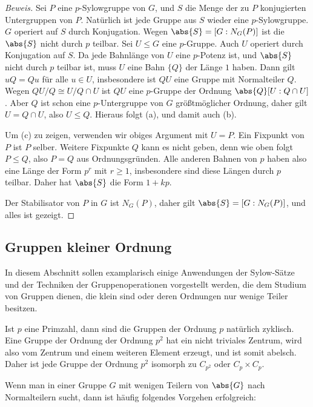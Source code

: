 \documentclass[12pt,a4paper,twoside]{article}
\begin{document}
\begin{proof}[Beweis]
  Sei $P$ eine $p$-Sylowgruppe von $G$, und $S$ die Menge der zu $P$
  konjugierten Untergruppen von $P$. Nat\"urlich ist jede Gruppe aus $S$
  wieder eine $p$-Sylowgruppe. $G$ operiert auf $S$ durch Konjugation. Wegen
  $\abs{S}=[G:N_G(P)]$ ist die $\abs{S}$ nicht durch $p$ teilbar. Sei $U\le G$
  eine $p$-Gruppe. Auch $U$ operiert durch Konjugation auf $S$. Da jede
  Bahnl\"ange von $U$ eine $p$-Potenz ist, und $\abs{S}$ nicht durch $p$
  teilbar ist, muss $U$ eine Bahn $\{Q\}$ der L\"ange $1$ haben. Dann gilt
  $uQ=Qu$ f\"ur alle $u\in U$, insbesondere ist $QU$ eine Gruppe mit
  Normalteiler $Q$. Wegen $QU/Q\cong U/Q\cap U$ ist $QU$ eine $p$-Gruppe der
  Ordnung $\abs{Q}[U:Q\cap U]$. Aber $Q$ ist schon eine $p$-Untergruppe von
  $G$ gr\"o\ss tm\"oglicher Ordnung, daher gilt $U=Q\cap U$, also $U\le Q$.
  Hieraus folgt (a), und damit auch (b).

Um (c) zu zeigen, verwenden wir obiges Argument mit $U=P$. Ein Fixpunkt von
$P$ ist $P$ selber. Weitere Fixpunkte $Q$ kann es nicht geben, denn wie oben
folgt $P\le Q$, also $P=Q$ aus Ordnungsgr\"unden. Alle anderen Bahnen von $p$
haben also eine L\"ange der Form $p^r$ mit $r\ge1$, insbesondere sind diese
L\"angen durch $p$ teilbar. Daher hat $\abs{S}$ die Form $1+kp$.

Der Stabilisator von $P$ in $G$ ist $N_G(P)$, daher gilt $\abs{S}=[G:N_G(P)]$,
und alles ist gezeigt.
\end{proof}
\subsection{Gruppen kleiner Ordnung}
In diesem Abschnitt sollen examplarisch einige Anwendungen der Sylow-S\"atze
und der Techniken der Gruppenoperationen vorgestellt werden, die dem Studium
von Gruppen dienen, die klein sind oder deren Ordnungen nur wenige Teiler
besitzen.

Ist $p$ eine Primzahl, dann sind die Gruppen der Ordnung $p$ nat\"urlich
zyklisch. Eine Gruppe der Ordnung der Ordnung $p^2$ hat ein nicht triviales
Zentrum, wird also vom Zentrum und einem weiteren Element erzeugt, und ist
somit abelsch. Daher ist jede Gruppe der Ordnung $p^2$ isomorph zu $C_{p^2}$
oder $C_p\times C_p$.

Wenn man in einer Gruppe $G$ mit wenigen Teilern von $\abs{G}$ nach
Normalteilern sucht, dann ist h\"aufig folgendes Vorgehen erfolgreich:
\end{document}
